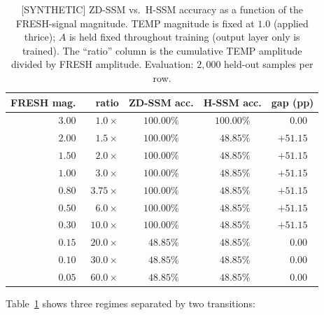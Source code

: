 \documentclass{article}
\begin{document}
\begin{table}[h]
  \centering
  \caption{[SYNTHETIC] ZD-SSM vs.\ H-SSM accuracy as a function of the FRESH-signal
  magnitude. TEMP magnitude is fixed at $1.0$ (applied thrice); $A$ is held
  fixed throughout training (output layer only is trained). The ``ratio''
  column is the cumulative TEMP amplitude divided by FRESH amplitude.
  Evaluation: $2{,}000$ held-out samples per row.}
  \label{tab:sweep}
  \begin{tabular}{rrccc}
    \toprule
    FRESH mag. & ratio & ZD-SSM acc. & H-SSM acc. & gap (pp) \\
    \midrule
    $3.00$ & $\phantom{0}1.0\times$ & $100.00\%$ & $100.00\%$ & $\phantom{+}0.00$ \\
    $2.00$ & $\phantom{0}1.5\times$ & $100.00\%$ & $\phantom{0}48.85\%$ & $+51.15$ \\
    $1.50$ & $\phantom{0}2.0\times$ & $100.00\%$ & $\phantom{0}48.85\%$ & $+51.15$ \\
    $1.00$ & $\phantom{0}3.0\times$ & $100.00\%$ & $\phantom{0}48.85\%$ & $+51.15$ \\
    $0.80$ & $\phantom{0}3.75\times$ & $100.00\%$ & $\phantom{0}48.85\%$ & $+51.15$ \\
    $0.50$ & $\phantom{0}6.0\times$ & $100.00\%$ & $\phantom{0}48.85\%$ & $+51.15$ \\
    $0.30$ & $10.0\times$ & $100.00\%$ & $\phantom{0}48.85\%$ & $+51.15$ \\
    $0.15$ & $20.0\times$ & $\phantom{0}48.85\%$ & $\phantom{0}48.85\%$ & $\phantom{+}0.00$ \\
    $0.10$ & $30.0\times$ & $\phantom{0}48.85\%$ & $\phantom{0}48.85\%$ & $\phantom{+}0.00$ \\
    $0.05$ & $60.0\times$ & $\phantom{0}48.85\%$ & $\phantom{0}48.85\%$ & $\phantom{+}0.00$ \\
    \bottomrule
  \end{tabular}
\end{table}

Table~\ref{tab:sweep} shows three regimes separated by two transitions:
\end{document}
